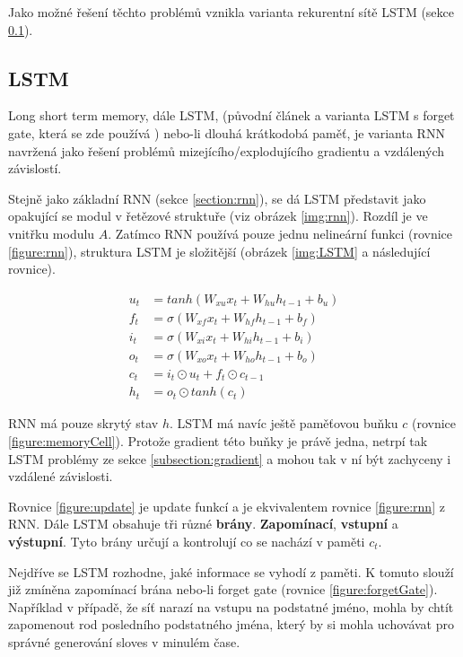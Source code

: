 Jako možné řešení těchto problémů vznikla varianta rekurentní sítě LSTM (sekce \ref{section:LSTM}).


\subsection{LSTM}\label{section:LSTM}
Long short term memory, dále LSTM, (původní článek \cite{LSTM} a varianta LSTM s forget gate, která se zde používá \cite{forgetLSTM}) nebo-li dlouhá krátkodobá paměť, je varianta RNN navržená jako řešení problémů mizejícího/explodujícího gradientu a vzdálených závislostí.

Stejně jako základní RNN (sekce \ref{section:rnn}), se dá LSTM představit jako opakující se modul v řetězové struktuře (viz obrázek \ref{img:rnn}). Rozdíl je ve vnitřku modulu $A$. Zatímco RNN používá pouze jednu nelineární funkci (rovnice \ref{figure:rnn}), struktura LSTM je složitější (obrázek \ref{img:LSTM} a následující rovnice).

\begin{align}
    u_{t}&=tanh(W_{xu}x_t + W_{hu}h_{t-1} + b_u) \label{figure:update} \\
    f_{t}&=\sigma(W_{xf}x_{t}+W_{hf}h_{t-1}+b_{f}) \label{figure:forgetGate} \\
    i_{t}&=\sigma(W_{xi}x_{t}+W_{hi}h_{t-1}+b_{i}) \label{figure:inputGate} \\
    o_{t}&=\sigma(W_{xo}x_{t}+W_{ho}h_{t-1}+b_{o}) \label{figure:outputGate} \\
    c_{t}&=i_{t}\odot u_{t}+f_{t}\odot c_{t-1}\label{figure:memoryCell} \\
    h_{t}&=o_{t}\odot tanh(c_{t}) \label{figure:hiddenState}
\end{align}

RNN má pouze skrytý stav $h$. LSTM má navíc ještě paměťovou buňku $c$ (rovnice \ref{figure:memoryCell}). Protože gradient této buňky je právě jedna, netrpí tak LSTM problémy ze sekce \ref{subsection:gradient} a mohou tak v ní být zachyceny i vzdálené závislosti.

Rovnice \ref{figure:update} je update funkcí a je ekvivalentem rovnice \ref{figure:rnn} z RNN.
Dále LSTM obsahuje tři různé \textbf{brány}. \textbf{Zapomínací}, \textbf{vstupní} a \textbf{výstupní}. Tyto brány určují a kontrolují co se nachází v paměti $c_t$.

Nejdříve se LSTM rozhodne, jaké informace se vyhodí z paměti. K tomuto slouží již zmíněna zapomínací brána nebo-li forget gate (rovnice \ref{figure:forgetGate}). Například v případě, že síť narazí na vstupu na podstatné jméno, mohla by chtít zapomenout rod posledního podstatného jména, který by si mohla uchovávat pro správné generování sloves v minulém čase.

